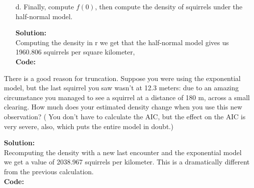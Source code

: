 \documentclass[12pt]{article}
\makeatletter
\theoremstyle{homework}
\newenvironment{exercise}[1]
{\def\@currentlabel{#1}\exercisecore}
{\endexercisecore}
\newcommand{\localhead}[1]{\par\smallskip\noindent\textbf{#1}\nobreak\\}%
\newcommand\solution{\localhead{Solution:}}
\makeatother
\begin{document}
\begin{exercise}{2}
\begin{enumerate}
    \vspace{.15in}



    \item[d.] Finally, compute $f(0)$, then compute the density of squirrels under the half-normal model.\\
    \solution Computing the density in r we get that the half-normal model gives us 1960.806 squirrels per square kilometer, \\
    \textbf{Code:}
    \begin{center}
       
    \end{center}
  
  \end{enumerate}

\end{exercise}
\vspace{1in}


\begin{exercise}{3} There is a good reason for truncation. Suppose you were using the exponential model, but the last squirrel you saw wasn’t at 
  12.3 meters: due to an amazing circumstance you managed to see a squirrel at a distance of 180 m, across a small clearing. How much 
  does your estimated density change when you use this new observation? ( You don't have to calculate the AIC, but the effect on the 
  AIC is very severe, also, which puts the entire model in doubt.)\\
  \solution Recomputing the density with a new last encounter and the exponential model we get a value of 2038.967 squirrels per kilometer. This is a dramatically 
  different from the previous calculation. \\
  \textbf{Code:}
  \begin{center}
     
  \end{center}
\end{exercise}
\vspace{1in}
\end{document}
